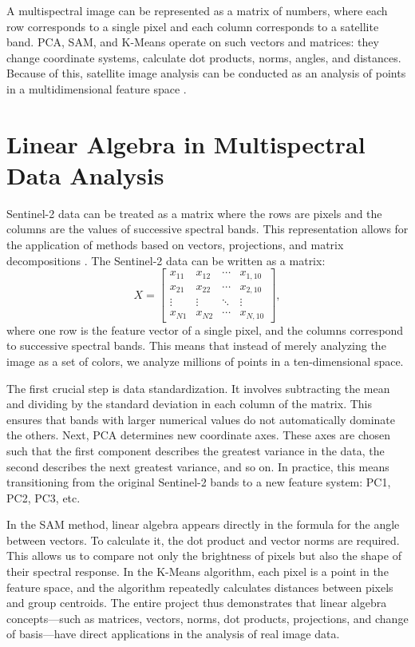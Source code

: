 \documentclass[12pt,a4paper]{article}
\begin{document}
    A multispectral image can be represented as a matrix of numbers, where each row corresponds to a single pixel and each column corresponds to a satellite band. PCA, SAM, and K-Means operate on such vectors and matrices: they change coordinate systems, calculate dot products, norms, angles, and distances. Because of this, satellite image analysis can be conducted as an analysis of points in a multidimensional feature space \cite{blum2020foundations,nag2019filters}.

    \section{Linear Algebra in Multispectral Data Analysis}
    \label{sec:algebra}

    Sentinel-2 data can be treated as a matrix where the rows are pixels and the columns are the values of successive spectral bands. This representation allows for the application of methods based on vectors, projections, and matrix decompositions \cite{blum2020foundations}. The Sentinel-2 data can be written as a matrix:
    \[
    X =
    \begin{bmatrix}
    x_{11} & x_{12} & \cdots & x_{1,10}\\
    x_{21} & x_{22} & \cdots & x_{2,10}\\
    \vdots & \vdots & \ddots & \vdots\\
    x_{N1} & x_{N2} & \cdots & x_{N,10}
    \end{bmatrix},
    \]
    where one row is the feature vector of a single pixel, and the columns correspond to successive spectral bands. This means that instead of merely analyzing the image as a set of colors, we analyze millions of points in a ten-dimensional space.

    The first crucial step is data standardization. It involves subtracting the mean and dividing by the standard deviation in each column of the matrix. This ensures that bands with larger numerical values do not automatically dominate the others. Next, PCA determines new coordinate axes. These axes are chosen such that the first component describes the greatest variance in the data, the second describes the next greatest variance, and so on. In practice, this means transitioning from the original Sentinel-2 bands to a new feature system: PC1, PC2, PC3, etc.

    In the SAM method, linear algebra appears directly in the formula for the angle between vectors. To calculate it, the dot product and vector norms are required. This allows us to compare not only the brightness of pixels but also the shape of their spectral response. In the K-Means algorithm, each pixel is a point in the feature space, and the algorithm repeatedly calculates distances between pixels and group centroids. The entire project thus demonstrates that linear algebra concepts—such as matrices, vectors, norms, dot products, projections, and change of basis—have direct applications in the analysis of real image data.
\end{document}
